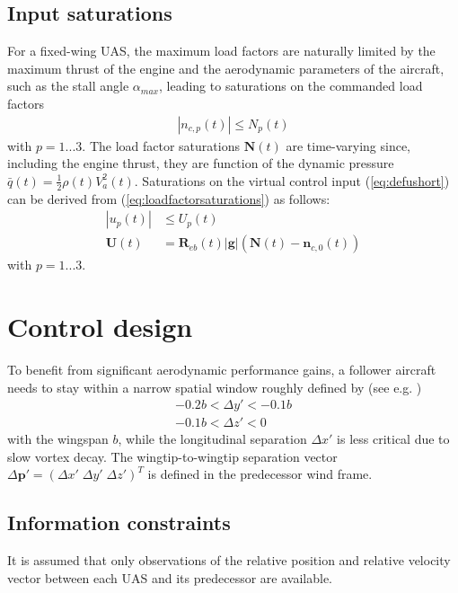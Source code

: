 \documentclass{ifacconf}
\providecommand{\mbf}[1]{\mathbf{#1}}
\newcommand{\idxAxis}{{\ensuremath{p}}}
\begin{document}
\subsection{Input saturations}
For a fixed-wing UAS, the maximum load factors are naturally limited by the maximum thrust of the engine and the aerodynamic parameters of the aircraft, such as the stall angle $\alpha_{max}$, leading to saturations on the commanded load factors
\begin{align}
|{n}_{c, \idxAxis}(t)| \leq {N}_\idxAxis(t)
\label{eq:loadfactorsaturations}
\end{align}
with $\idxAxis = 1...3$. The load factor saturations $\mbf{N}(t)$ are time-varying since, including the engine thrust, they are function of the dynamic pressure $\bar{q}(t) = \frac{1}{2}\rho(t) V_a^2(t)$.
Saturations on the virtual control input (\ref{eq:defushort}) can be derived from (\ref{eq:loadfactorsaturations}) as follows:
\begin{align}
|{u}_\idxAxis(t)| &\leq {U}_\idxAxis(t) \\
\mbf{U}(t) &= \mbf{R}_{eb}(t) |\mbf{g}|(\mbf{N}(t)-\mbf{n}_{c,0}(t))
\label{eq:saturationsonU}
\end{align}
with $\idxAxis = 1...3$.
\section{Control design}
\label{sec:controldesign}
To benefit from significant aerodynamic performance gains, a follower aircraft needs to stay within a narrow spatial window roughly defined by (see e.g. \cite{jake2003f})
\begin{align}
-0.2 b < \Delta y' < -0.1 b \\
-0.1 b < \Delta z' < 0 
\label{eq:windowz}
\end{align}
with the wingspan $b$, while the longitudinal separation $\Delta x'$ is less critical due to slow vortex decay. The wingtip-to-wingtip separation vector $\Delta \mbf{p'} = ( \Delta x' \; \Delta y' \; \Delta z')^T$ is defined in the predecessor wind frame.
\subsection{Information constraints}
It is assumed that only observations of the relative position and relative velocity vector between each UAS and its predecessor are available.
\end{document}
